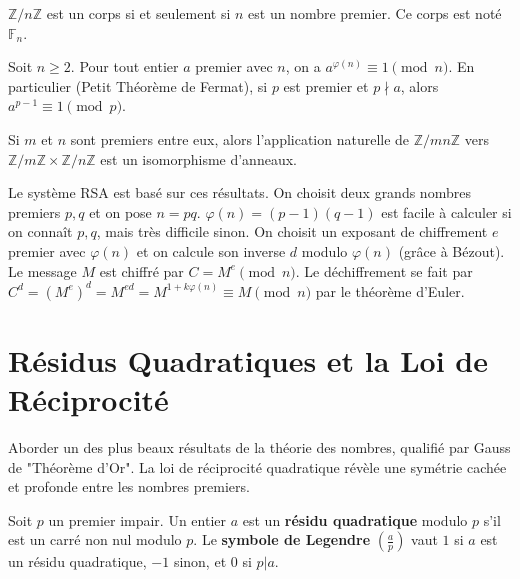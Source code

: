 \begin{corollary}
    $\mathbb{Z}/n\mathbb{Z}$ est un corps si et seulement si $n$ est un nombre premier. Ce corps est noté $\mathbb{F}_n$.
\end{corollary}

\begin{theorem}
    Soit $n \ge 2$. Pour tout entier $a$ premier avec $n$, on a $a^{\varphi(n)} \equiv 1 \pmod n$.
    En particulier (Petit Théorème de Fermat), si $p$ est premier et $p \nmid a$, alors $a^{p-1} \equiv 1 \pmod p$.
\end{theorem}

\begin{theorem}
    Si $m$ et $n$ sont premiers entre eux, alors l'application naturelle de $\mathbb{Z}/mn\mathbb{Z}$ vers $\mathbb{Z}/m\mathbb{Z} \times \mathbb{Z}/n\mathbb{Z}$ est un isomorphisme d'anneaux.
\end{theorem}

\begin{application}
    Le système RSA est basé sur ces résultats. On choisit deux grands nombres premiers $p,q$ et on pose $n=pq$. $\varphi(n)=(p-1)(q-1)$ est facile à calculer si on connaît $p,q$, mais très difficile sinon. On choisit un exposant de chiffrement $e$ premier avec $\varphi(n)$ et on calcule son inverse $d$ modulo $\varphi(n)$ (grâce à Bézout). Le message $M$ est chiffré par $C = M^e \pmod n$. Le déchiffrement se fait par $C^d = (M^e)^d = M^{ed} = M^{1+k\varphi(n)} \equiv M \pmod n$ par le théorème d'Euler.
\end{application}

\section{Résidus Quadratiques et la Loi de Réciprocité}

\begin{objectif}
    Aborder un des plus beaux résultats de la théorie des nombres, qualifié par Gauss de "Théorème d'Or". La loi de réciprocité quadratique révèle une symétrie cachée et profonde entre les nombres premiers.
\end{objectif}

\begin{definition}
    Soit $p$ un premier impair. Un entier $a$ est un \textbf{résidu quadratique} modulo $p$ s'il est un carré non nul modulo $p$.
    Le \textbf{symbole de Legendre} $\left(\frac{a}{p}\right)$ vaut $1$ si $a$ est un résidu quadratique, $-1$ sinon, et $0$ si $p|a$.
\end{definition}

